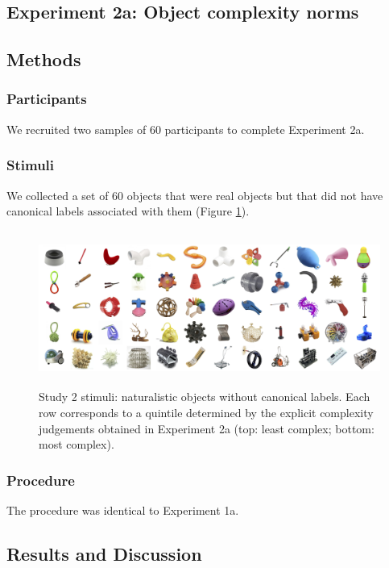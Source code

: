 \documentclass[man]{apa2}
\begin{document}
\subsection{\textbf{Experiment 2a: Object complexity norms}}

\subsection{Methods}
\subsubsection{Participants} We recruited two samples of 60 participants to complete Experiment 2a.

\subsubsection{Stimuli}
We collected a set of 60 objects that were real objects but that did not have canonical labels associated with them (Figure  \ref{fig:realobjs}). 

\begin{figure} 
  \begin{center} 
    \includegraphics[height=2in]{figures/realobjs_stimuli.png} 
    \caption{\label{fig:realobjs} Study 2 stimuli: naturalistic objects without canonical labels. Each row corresponds to a quintile determined by the explicit complexity judgements obtained in Experiment 2a (top: least complex; bottom: most complex).} 
  \end{center} 
\end{figure}	

\subsubsection{Procedure} The procedure was identical to Experiment 1a. 

\subsection{Results and Discussion}
\end{document}
